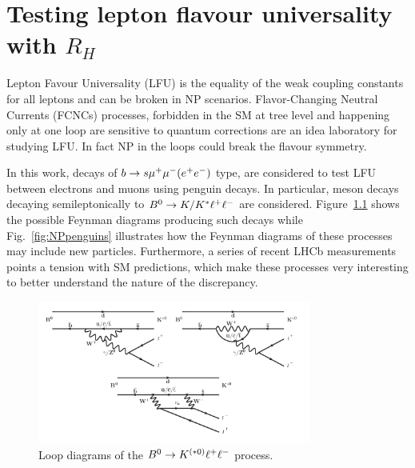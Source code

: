 \chapter{Testing lepton flavour universality with $R_H$}
\label{sec:RKst_theory}

Lepton Favour Universality (LFU) is the equality of the weak coupling constants for all leptons
and can be broken in NP scenarios. 
Flavor-Changing Neutral Currents (FCNCs) processes, forbidden in the SM at tree level and happening
only at one loop are sensitive to quantum corrections are an idea laboratory for studying LFU.
In fact NP in the loops could break the flavour symmetry.
 
In this work, decays of $b \rightarrow s{\mu^+\mu^-} (e^+ e^-)$ type, are considered to test LFU
between electrons and muons using penguin decays.
In particular, \Bz meson decays decaying semileptonically to ${{B}^0} \rightarrow K/{{K}^*}\ell^+ \ell^-$ are considered.
 Figure~\ref{fig:RKpenguins} shows the possible Feynman diagrams 
producing such decays while Fig.~\ref{fig:NPpenguins} illustrates how the Feynman 
diagrams of these processes may include new particles. 
Furthermore, a series of recent LHCb measurements~\cite{TomRDreview}
points a tension with SM predictions, which make these processes very interesting
to better understand the nature of the discrepancy.
%
\begin{figure}[h]
\centering \includegraphics[width=0.8\textwidth]{RKst/figs/penguins3.png}
\caption{Loop diagrams of the ${{B}^0} \rightarrow K^{(*0)}\ell^+ \ell^-$ process.}
\label{fig:RKpenguins}
\end{figure}

